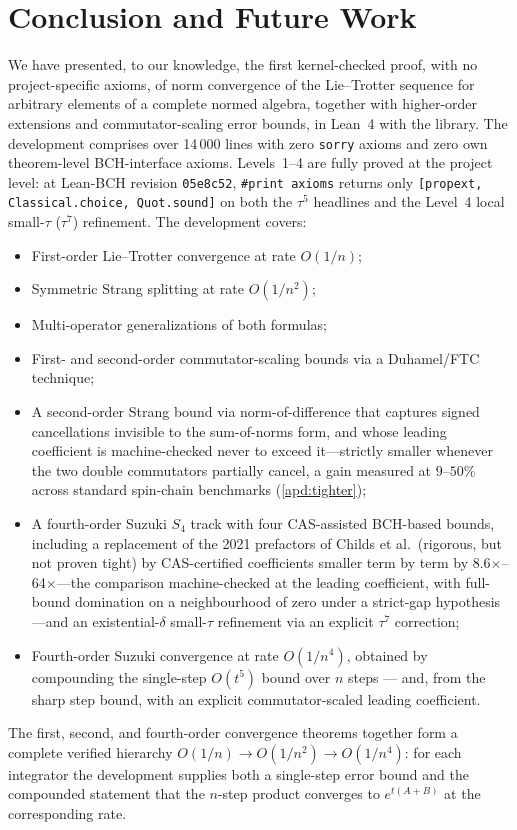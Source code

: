 \section{Conclusion and Future Work}
\label{sec:conclusion}

We have presented, to our knowledge, the first kernel-checked proof, with no
project-specific axioms, of norm convergence of the Lie--Trotter sequence for
arbitrary elements of a complete normed algebra, together with higher-order
extensions and commutator-scaling error bounds, in Lean~4 with the \Mathlib
library.
The development comprises over 14\,000 lines with zero \texttt{sorry} axioms
and zero own theorem-level BCH-interface axioms. Levels~1--4 are fully
proved at the project level: at Lean-BCH revision \texttt{05e8c52},
\texttt{\#print axioms} returns only \texttt{[propext,
Classical.choice, Quot.sound]} on both the $\tau^5$ headlines and the
Level~4 local small-$\tau$ ($\tau^7$) refinement. The development covers:
\begin{itemize}
  \item First-order Lie--Trotter convergence at rate $O(1/n)$;
  \item Symmetric Strang splitting at rate $O(1/n^2)$;
  \item Multi-operator generalizations of both formulas;
  \item First- and second-order commutator-scaling bounds via a
    Duhamel/FTC technique;
  \item A second-order Strang bound via norm-of-difference that captures
    signed cancellations invisible to the sum-of-norms form, and whose
    leading coefficient is machine-checked never to exceed it---strictly
    smaller whenever the two double commutators partially cancel, a gain
    measured at $9$--$50\%$ across standard spin-chain benchmarks
    (\cref{apd:tighter});
  \item A fourth-order Suzuki $S_4$ track with four CAS-assisted
    BCH-based bounds, including a replacement of the 2021 prefactors of
    Childs et al.\ (rigorous, but not proven tight) by CAS-certified
    coefficients smaller term by term by 8.6$\times$--64$\times$---the
    comparison machine-checked at the leading coefficient, with full-bound
    domination on a neighbourhood of zero under a strict-gap
    hypothesis---and an existential-$\delta$ small-$\tau$ refinement via
    an explicit $\tau^7$ correction;
  \item Fourth-order Suzuki convergence at rate $O(1/n^4)$, obtained by
    compounding the single-step $O(t^5)$ bound over $n$ steps --- and, from
    the sharp step bound, with an explicit commutator-scaled leading
    coefficient.
\end{itemize}
The first, second, and fourth-order convergence theorems together form a
complete verified hierarchy $O(1/n) \to O(1/n^2) \to O(1/n^4)$: for each
integrator the development supplies both a single-step error bound and the
compounded statement that the $n$-step product converges to $e^{t(A+B)}$ at the
corresponding rate.

